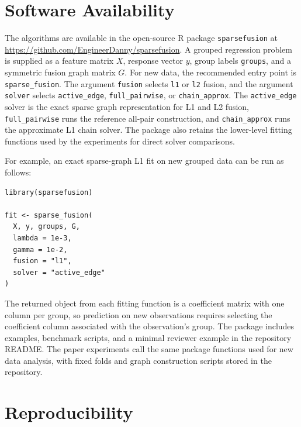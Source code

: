 \documentclass[twoside,11pt]{article}
\newcommand{\sparsefusion}{\texttt{sparsefusion}\xspace}
\begin{document}
\section{Software Availability}

The algorithms are available in the open-source R package \sparsefusion at
\url{https://github.com/EngineerDanny/sparsefusion}. A grouped regression problem
is supplied as a feature matrix $X$, response vector $y$, group labels
\texttt{groups}, and a symmetric fusion graph matrix $G$. For new data, the
recommended entry point is \texttt{sparse\_fusion}. The argument
\texttt{fusion} selects \texttt{l1} or \texttt{l2} fusion, and the argument
\texttt{solver} selects \texttt{active\_edge}, \texttt{full\_pairwise}, or
\texttt{chain\_approx}. The \texttt{active\_edge} solver is the exact sparse
graph representation for L1 and L2 fusion, \texttt{full\_pairwise} runs the
reference all-pair construction, and \texttt{chain\_approx} runs the
approximate L1 chain solver. The package also retains the lower-level fitting
functions used by the experiments for direct solver comparisons.

For example, an exact sparse-graph L1 fit on new grouped data can be run as
follows:
\begin{verbatim}
library(sparsefusion)

fit <- sparse_fusion(
  X, y, groups, G,
  lambda = 1e-3,
  gamma = 1e-2,
  fusion = "l1",
  solver = "active_edge"
)
\end{verbatim}

The returned object from each fitting function is a coefficient matrix with
one column per group, so prediction on new observations requires selecting the
coefficient column associated with the observation's group. The package
includes examples, benchmark scripts, and a minimal reviewer example in the
repository README. The paper experiments call the same package functions used
for new data analysis, with fixed folds and graph construction scripts stored
in the repository.

\section{Reproducibility}
\end{document}
